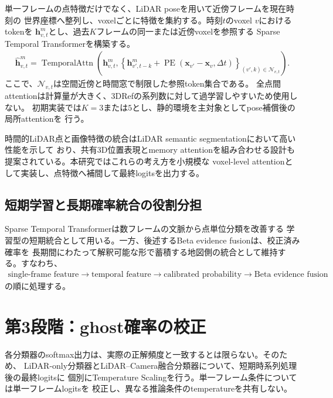 \documentclass[uplatex,a4paper,11pt]{jsarticle}
\begin{document}
単一フレームの点特徴だけでなく、LiDAR poseを用いて近傍フレームを現在時刻の
世界座標へ整列し、voxelごとに特徴を集約する。時刻$t$のvoxel $v$におけるtokenを
$\bm{h}_{v,t}^{m}$とし、過去$K$フレームの同一または近傍voxelを参照する
Sparse Temporal Transformerを構築する。
\begin{align}
  \hat{\bm{h}}_{v,t}^{m}
  =
  \operatorname{TemporalAttn}
  \left(
    \bm{h}_{v,t}^{m},
    \left\{
      \bm{h}_{v',t-k}^{m}
      +
      \operatorname{PE}
      \left(
        \bm{x}_{v'}-\bm{x}_{v},
        \Delta t
      \right)
    \right\}_{(v',k)\in\mathcal{N}_{v,t}}
  \right).
\end{align}
ここで、$\mathcal{N}_{v,t}$は空間近傍と時間窓で制限した参照token集合である。
全点間attentionは計算量が大きく、3DRefの系列数に対して過学習しやすいため使用しない。
初期実装では$K=3$または$5$とし、静的環境を主対象としてpose補償後の局所attentionを
行う。

時間的LiDAR点と画像特徴の統合はLiDAR semantic segmentationにおいて高い性能を示して
おり\cite{wu2024_taseg}、共有3D位置表現とmemory attentionを組み合わせる設計も
提案されている\cite{xu2025_sam4d}。本研究ではこれらの考え方を小規模な
voxel-level attentionとして実装し、点特徴へ補間して最終logitsを出力する。

\subsection{短期学習と長期確率統合の役割分担}

Sparse Temporal Transformerは数フレームの文脈から点単位分類を改善する
学習型の短期統合として用いる。一方、後述するBeta evidence fusionは、校正済み確率を
長期間にわたって解釈可能な形で蓄積する地図側の統合として維持する。すなわち、
\begin{align}
  \text{single-frame feature}
  \rightarrow
  \text{temporal feature}
  \rightarrow
  \text{calibrated probability}
  \rightarrow
  \text{Beta evidence fusion}
\end{align}
の順に処理する。

\section{第3段階：ghost確率の校正}

各分類器のsoftmax出力は、実際の正解頻度と一致するとは限らない。そのため、
LiDAR-only分類器とLiDAR--Camera融合分類器について、短期時系列処理後の最終logitsに
個別にTemperature Scalingを行う。単一フレーム条件については単一フレームlogitsを
校正し、異なる推論条件のtemperatureを共有しない。
\end{document}

